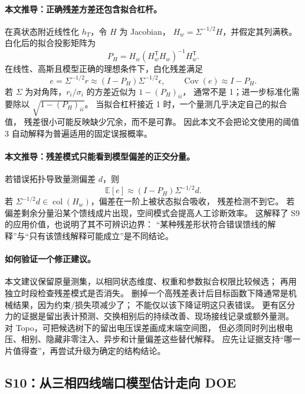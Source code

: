 \paragraph{本文推导：正确残差方差还包含拟合杠杆。}
在真状态附近线性化 $h_T$，令 $H$ 为 Jacobian，
$H_w=\Sigma^{-1/2}H$，并假定其列满秩。
白化后的拟合投影矩阵为
\begin{equation}
 P_H=H_w(H_w^{\mathsf T}H_w)^{-1}H_w^{\mathsf T}.
 \label{eq:eng-s9-projector}
\end{equation}
在线性、高斯且模型正确的理想条件下，白化残差满足
\begin{equation}
 e=\Sigma^{-1/2}r\approx(I-P_H)\Sigma^{-1/2}\epsilon,
 \qquad \operatorname{Cov}(e)\approx I-P_H.
 \label{eq:eng-s9-residual-cov}
\end{equation}
若 $\Sigma$ 为对角阵，$r_i/\sigma_i$ 的方差近似为 $1-(P_H)_{ii}$，
通常不是 1；进一步标准化需要除以 $\sqrt{1-(P_H)_{ii}}$。
当拟合杠杆接近 1 时，一个量测几乎决定自己的拟合值，
残差很小可能反映缺少冗余，而不是可靠。
因此本文不会把论文使用的阈值 3 自动解释为普遍适用的固定误报概率。

\paragraph{本文推导：残差模式只能看到模型偏差的正交分量。}
若错误拓扑导致量测偏差 $d$，则
\begin{equation}
 \mathbb E[e]\approx(I-P_H)\Sigma^{-1/2}d.
 \label{eq:eng-s9-detection}
\end{equation}
若 $\Sigma^{-1/2}d\in\operatorname{col}(H_w)$，偏差在一阶上被状态拟合吸收，
残差检测不到它。
若偏差剩余分量沿某个馈线成片出现，空间模式会提高人工诊断效率。
这解释了 S9 的应用价值，也说明了其不可辨识边界：
“某种残差形状符合错误馈线的解释”与“只有该馈线解释可能成立”是不同结论。

\paragraph{如何验证一个修正建议。}
本文建议保留原量测集，以相同状态维度、权重和参数拟合权限比较候选；
再用独立时段检查残差模式是否消失。
删掉一个高残差表计后目标函数下降通常是机械结果，因为约束/损失项减少了；
不能仅以该下降证明这只表错误。
更有区分力的证据是留出表计预测、交换相别后的持续改善、现场接线记录或额外量测。
对 Topo，可把候选树下的留出电压误差画成末端空间图，
但必须同时列出根电压、相别、隐藏非零注入、异步和计量偏差这些替代解释。
应先让证据支持“哪一片值得查”，再尝试升级为确定的结构结论。

\subsection{S10：从三相四线端口模型估计走向 DOE}
\label{subsec:S10}

